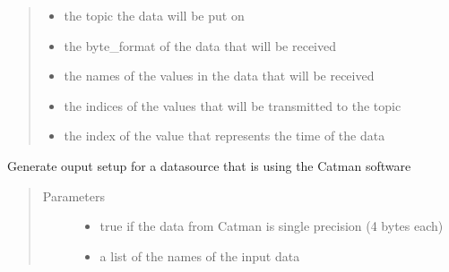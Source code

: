 \documentclass[letterpaper,10pt,english]{sphinxmanual}
\begin{document}
\begin{fulllineitems}
\begin{fulllineitems}
\begin{quote}
\begin{description}
\begin{itemize}
\item {} 
 \textendash{} the topic the data will be put on

\item {} 
 \textendash{} the byte\_format of the data that will be received

\item {} 
 \textendash{} the names of the values in the data that will be received

\item {} 
 \textendash{} the indices of the values that will be transmitted to the topic

\item {} 
 \textendash{} the index of the value that represents the time of the data

\end{itemize}

\end{description}\end{quote}

\end{fulllineitems}


\end{fulllineitems}


\begin{fulllineitems}
\label{\detokenize{src.datasources:src.datasources.models.generate_catman_outputs}}
Generate ouput setup for a datasource that is using the Catman software
\begin{quote}\begin{description}
\item[{Parameters}] \leavevmode\begin{itemize}
\item {} 
 \textendash{} true if the data from Catman is single precision (4 bytes each)

\item {} 
 \textendash{} a list of the names of the input data

\end{itemize}

\end{description}\end{quote}

\end{fulllineitems}
\end{document}
